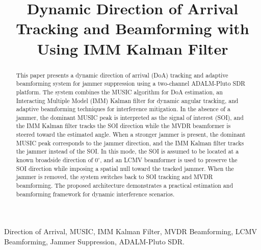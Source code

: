 \documentclass[conference]{IEEEtran}
\begin{document}
\title{Dynamic Direction of Arrival Tracking and Beamforming with Using IMM Kalman Filter}

\author{
\and
{}
}

\maketitle

\begin{abstract}
This paper presents a dynamic direction of arrival (DoA) tracking and adaptive beamforming system for jammer suppression using a two-channel ADALM-Pluto SDR platform. The system combines the MUSIC algorithm for DoA estimation, an Interacting Multiple Model (IMM) Kalman filter for dynamic angular tracking, and adaptive beamforming techniques for interference mitigation. In the absence of a jammer, the dominant MUSIC peak is interpreted as the signal of interest (SOI), and the IMM Kalman filter tracks the SOI direction while the MVDR beamformer is steered toward the estimated angle. When a stronger jammer is present, the dominant MUSIC peak corresponds to the jammer direction, and the IMM Kalman filter tracks the jammer instead of the SOI. In this mode, the SOI is assumed to be located at a known broadside direction of $0^\circ$, and an LCMV beamformer is used to preserve the SOI direction while imposing a spatial null toward the tracked jammer. When the jammer is removed, the system switches back to SOI tracking and MVDR beamforming. The proposed architecture demonstrates a practical estimation and beamforming framework for dynamic interference scenarios.
\end{abstract}

\begin{IEEEkeywords}
Direction of Arrival, MUSIC, IMM Kalman Filter, MVDR Beamforming, LCMV Beamforming, Jammer Suppression, ADALM-Pluto SDR.
\end{IEEEkeywords}
\end{document}
